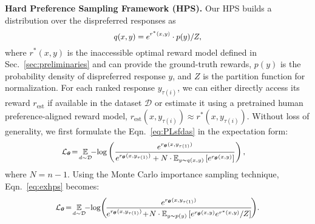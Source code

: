  \textbf{Hard Preference Sampling Framework (HPS).}  Our HPS builds a distribution over the  dispreferred responses  as  
\begin{equation}
	\fontsize{9}{3}\selectfont{
		\begin{aligned}
			q(x, y) =  e^{{r^{*}(x,y)}}\cdot p(y) / Z, 
	\end{aligned}}
\end{equation}
where $r^*(x, y)$ is the  inaccessible optimal  reward model defined in Sec.~\ref{sec:preliminaries}  and can provide  the ground-truth rewards,  $p(y)$ is the probability density of dispreferred response $y$, and  $Z$ is the partition function for normalization.  For each ranked response \(y_{\tau(i)}\), we can either directly access its reward $r_{\text{est}}$ if available in the dataset $\mathcal{D}$ or estimate it using a pretrained human preference-aligned reward model, $r_{\text{est}}(x,y_{\tau(i)})\approx r^{*}(x,y_{\tau(i)})$. Without loss of generality, we first formulate the Eqn.~\eqref{eq:PLsfdas} in the expectation form:
\begin{equation}
	\fontsize{9}{3}\selectfont{
		\begin{aligned}
        \label{eq:exhps}
			& \mathcal{L}_{\wm}\!=\! \expectation_{d\sim\mathcal{D}}   \!
			\!-\!\log\left(\frac{e^{{ r_{\wm}(x,y_{\tau\left( 1\right)})}}}{e^{{ r_{\wm}(x,y_{\tau\left( 1\right)})}}+ N\cdot\expectation\nolimits_{y \sim q(x,y)}\left[e^{{r_{\wm}(x,y)}}\right]}\right),
\end{aligned}}
\end{equation}
where $N=n-1$.  Using the Monte Carlo importance sampling technique,  Eqn.~\eqref{eq:exhps} becomes:
\begin{equation*}
	\fontsize{9}{3}\selectfont{
		\begin{aligned}
\mathcal{L}_{\wm}\!=\!    \expectation_{d\sim\mathcal{D}}   \!
			\!-\!\log\!\left(\!\frac{e^{{ r_{\wm}(x,y_{\tau\left( 1\right)})}}}{e^{{ r_{\wm}(x,y_{\tau\left( 1\right)})}}\!+\! N\cdot\expectation\nolimits_{y \sim p(y)}\left[e^{{r_{\wm}(x,y)}}e^{{ r^{*}(x,y)}}/{Z}\right]}\!\right)\!.
	\end{aligned}}
\end{equation*}
